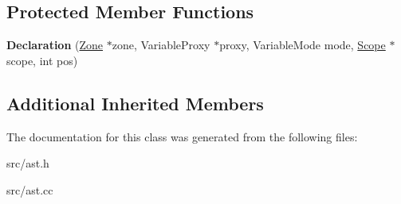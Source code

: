 \subsection*{Protected Member Functions}
\begin{DoxyCompactItemize}
\item 
\hypertarget{classv8_1_1internal_1_1_declaration_a222d6f7ae3b291f5e00249cca9fec476}{}{\bfseries Declaration} (\hyperlink{classv8_1_1internal_1_1_zone}{Zone} $\ast$zone, Variable\+Proxy $\ast$proxy, Variable\+Mode mode, \hyperlink{classv8_1_1internal_1_1_scope}{Scope} $\ast$scope, int pos)\label{classv8_1_1internal_1_1_declaration_a222d6f7ae3b291f5e00249cca9fec476}

\end{DoxyCompactItemize}
\subsection*{Additional Inherited Members}


The documentation for this class was generated from the following files\+:\begin{DoxyCompactItemize}
\item 
src/ast.\+h\item 
src/ast.\+cc\end{DoxyCompactItemize}
